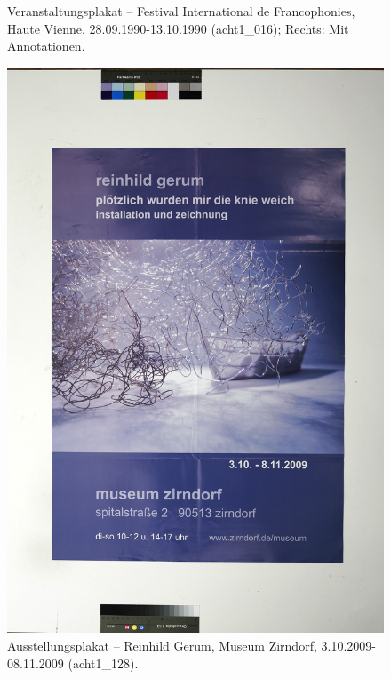 \documentclass[a4paper,12pt,ngerman]{article}
\begin{document}
\begin{landscape}
\begin{figure}[ht]
\begin{subfigure}[b]{0.5\linewidth}
	\end{subfigure}
	\caption{Veranstaltungsplakat – Festival International de Francophonies, Haute Vienne, 28.09.1990-13.10.1990 (acht1\_016); Rechts: Mit Annotationen.}
\end{figure}
\end{landscape}

\newpage
\begin{figure}[ht]
\includegraphics[width=\linewidth]{Abbildung_32_(acht1_128)}
\centering
\caption{Ausstellungsplakat – Reinhild Gerum, Museum Zirndorf, 3.10.2009-08.11.2009 (acht1\_128).}
\end{figure}
\end{document}
